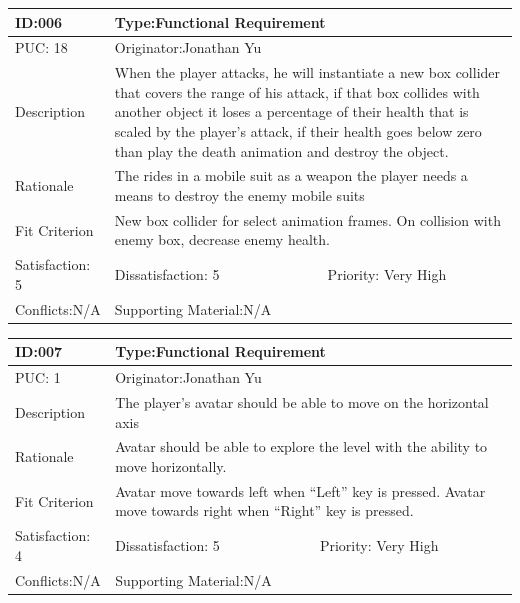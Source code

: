 \documentclass{article}
\begin{document}
\begin{table}[H]
\begin{tabular}{|l|l|l|}
\hline
ID:006& \multicolumn{2}{l|}{Type:Functional Requirement} \\ \hline
PUC: 18& \multicolumn{2}{l|}{Originator:Jonathan Yu} \\ \hline
Description & \multicolumn{2}{m{0.85\textwidth}|}{When the player attacks, he will instantiate a new box collider that covers the range of his attack, if that box collides with another object it loses a percentage  of their health that is scaled by the player’s attack, if their health goes below zero than play the death animation and destroy the object.}\\\hline
Rationale & \multicolumn{2}{m{0.85\textwidth}|}{The rides in a mobile suit as a weapon the player needs a means to destroy the enemy mobile suits} \\ \hline
Fit Criterion & \multicolumn{2}{m{0.85\textwidth}|}{New box collider for select animation frames. On collision with enemy box, decrease enemy health.} \\ \hline
Satisfaction: 5 & Dissatisfaction: 5 & Priority: Very High \\ \hline
Conflicts:N/A & \multicolumn{2}{l|}{Supporting Material:N/A} \\ \hline
\end{tabular}
\end{table}


\begin{table}[H]
\begin{tabular}{|l|l|l|}
\hline
ID:007&\multicolumn{2}{l|}{Type:Functional Requirement} \\ \hline
PUC: 1& \multicolumn{2}{l|}{Originator:Jonathan Yu} \\ \hline
Description & \multicolumn{2}{m{0.85\textwidth}|}{The player’s avatar should be able to move on the horizontal axis }\\\hline
Rationale & \multicolumn{2}{m{0.85\textwidth}|}{Avatar should be able to explore the level with the ability to move horizontally.} \\ \hline
Fit Criterion & \multicolumn{2}{m{0.85\textwidth}|}{Avatar move towards left when “Left” key is pressed. Avatar move towards right when “Right” key is pressed.} \\ \hline
Satisfaction: 4 & Dissatisfaction: 5 & Priority: Very High \\ \hline
Conflicts:N/A & \multicolumn{2}{l|}{Supporting Material:N/A} \\ \hline
\end{tabular}
\end{table}
\end{document}
